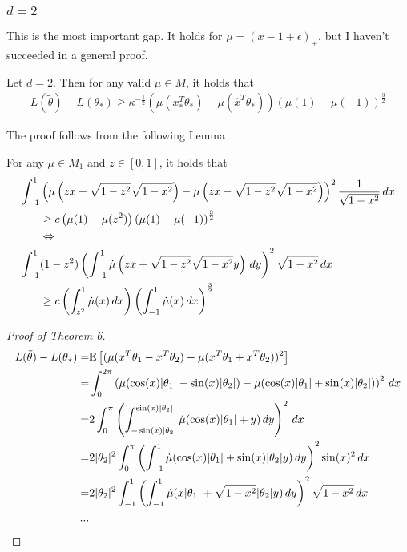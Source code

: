 \subsubsection{$d=2$}
\color{red}This is the most important gap. It holds for $\mu = (x-1+\epsilon)_+$, but I haven't succeeded in a general proof.\color{black}
\begin{proposition}
Let $d=2$. Then for any valid $\mu \in M$, it holds that 
\begin{align*}
    L(\tilde{\theta})-L(\theta_*) \geq \kappa^{-\frac{1}{2}}(\mu(x_*^T\theta_*)-\mu(\hat{x}^T\theta_*))(\mu(1)-\mu(-1))^{\frac{3}{2}}
\end{align*}
\end{proposition}
The proof follows from the following Lemma
\begin{lemma}
    For any $\mu\in M_1$ and $z \in [0,1]$, it holds that
\begin{align*}
\int_{-1}^1&\left(\mu\left(zx + \sqrt{1-z^2}\sqrt{1-x^2}\right)-\mu\left(zx - \sqrt{1-z^2}\sqrt{1-x^2}\right)\right)^2\frac{1}{\sqrt{1-x^2}}\,dx \\
&\geq c \left(\mu(1)-\mu(z^2)\right)\left(\mu(1)-\mu(-1)\right)^\frac{3}{2}\\
& \Leftrightarrow\\
\int_{-1}^1&(1-z^2)\left(\int_{-1}^1\dot{\mu}\left(zx+\sqrt{1-z^2}\sqrt{1-x^2} y\right)\,dy\right)^2\sqrt{1-x^2}\,dx \\
&\geq c \left(\int_{z^2}^1\dot{\mu}(x)\,dx\right)\left(\int_{-1}^1\dot{\mu}(x)\,dx\right)^\frac{3}{2}
\end{align*}
\end{lemma}
\begin{proof}[Proof of Theorem 6]

\begin{align*}
    L(\tilde{\theta})-L(\theta_*)
    =&\mathbb{E}\left[(\mu(x^T\theta_1-x^T\theta_2)-\mu(x^T\theta_1+x^T\theta_2))^2\right]\\
    =&\int_{0}^{2\pi}\left(\mu(\cos(x)|\theta_1|-\sin(x)|\theta_2|)-\mu(\cos(x)|\theta_1|+\sin(x)|\theta_2|)\right)^2\, dx\\
    =&2\int_{0}^{\pi}\left(\int_{-\sin(x)|\theta_2|}^{\sin(x)|\theta_2|}\dot{\mu}(\cos(x)|\theta_1|+y)\,dy\right)^2\, dx\\
    =&2|\theta_2|^2\int_{0}^{\pi}\left(\int_{-1}^{1}\dot{\mu}(\cos(x)|\theta_1|+\sin(x)|\theta_2|y)\,dy\right)^2\sin(x)^2\, dx\\
    =&2|\theta_2|^2\int_{-1}^{1}\left(\int_{-1}^{1}\dot{\mu}(x|\theta_1|+\sqrt{1-x^2}|\theta_2|y)\,dy\right)^2\sqrt{1-x^2}\, dx\\
...
\end{align*}
\end{proof}

